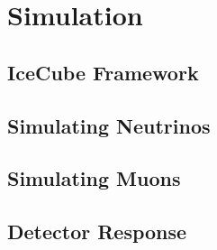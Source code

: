 \chapter{Simulation}

\section{IceCube Framework}
\section{Simulating Neutrinos}
\section{Simulating Muons}
\section{Detector Response}
